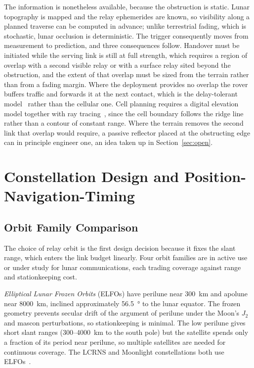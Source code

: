 \documentclass[11pt,a4paper]{article}
\begin{document}
The information is nonetheless available, because the obstruction is static. Lunar topography is mapped and the relay ephemerides are known, so visibility along a planned traverse can be computed in advance; unlike terrestrial fading, which is stochastic, lunar occlusion is deterministic. The trigger consequently moves from measurement to prediction, and three consequences follow. Handover must be initiated while the serving link is still at full strength, which requires a region of overlap with a second visible relay or with a surface relay sited beyond the obstruction, and the extent of that overlap must be sized from the terrain rather than from a fading margin. Where the deployment provides no overlap the rover buffers traffic and forwards it at the next contact, which is the delay-tolerant model~\cite{rfc9171,rfc4838} rather than the cellular one. Cell planning requires a digital elevation model together with ray tracing~\cite{azami_terrain_aware,zhu_channel_ray}, since the cell boundary follows the ridge line rather than a contour of constant range. Where the terrain removes the second link that overlap would require, a passive reflector placed at the obstructing edge can in principle engineer one, an idea taken up in Section~\ref{sec:open}.


\section{Constellation Design and Position-Navigation-Timing}
\label{sec:pnt}

\subsection{Orbit Family Comparison}
The choice of relay orbit is the first design decision because it fixes the slant range, which enters the link budget linearly. Four orbit families are in active use or under study for lunar communications, each trading coverage against range and stationkeeping cost.

\emph{Elliptical Lunar Frozen Orbits} (ELFOs) have perilune near \SI{300}{km} and apolune near \SI{8000}{km}, inclined approximately \SI{56.5}{\degree} to the lunar equator. The frozen geometry prevents secular drift of the argument of perilune under the Moon's $J_2$ and mascon perturbations, so stationkeeping is minimal. The low perilune gives short slant ranges (\SI{300}{}--\SI{4000}{km} to the south pole) but the satellite spends only a fraction of its period near perilune, so multiple satellites are needed for continuous coverage. The LCRNS and Moonlight constellations both use ELFOs~\cite{lcrns_ref_const,esa_moonlight_csc}.
\end{document}
